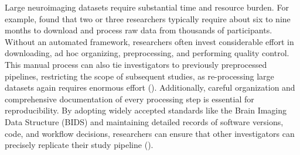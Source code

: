 Large neuroimaging datasets require substantial time and resource burden. 
For example, \cite{horien2021hitchhiker} found that two or three researchers typically 
require about six to nine months to download and process raw data from thousands of participants. 
Without an automated framework, researchers often invest considerable effort in downloading, 
ad hoc organizing, preprocessing, and performing quality control. 
This manual process can also tie investigators to previously preprocessed pipelines, 
restricting the scope of subsequent studies, as re-processing large datasets again 
requires enormous effort (\cite{horien2021hitchhiker}). 
Additionally, careful organization and comprehensive documentation of every processing step is essential for reproducibility. 
By adopting widely accepted standards like the Brain Imaging Data Structure (BIDS) and 
maintaining detailed records of software versions, code, and workflow decisions, 
researchers can ensure that other investigators can precisely replicate their study pipeline (\cite{white2022data, horien2021hitchhiker}). 

